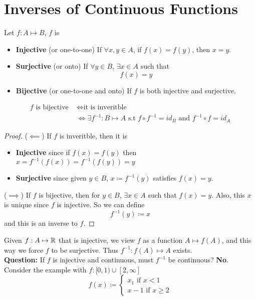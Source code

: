 \documentclass[openany]{report}
\begin{document}
    \section{Inverses of Continuous Functions}
        Let $f: A \mapsto B$, $f$ is  
        \begin{itemize}
            \item \textbf{Injective} (or one-to-one) If $\forall x,y \in A$, if $f(x) = f(y)$, then $x = y$.
            \item \textbf{Surjective} (or onto) If $\forall y \in B$, $\exists x \in A$ such that 
            \[f(x) = y\]
            \item \textbf{Bijective} (or one-to-one and onto) If $f$ is both injective and surjective.
        \end{itemize}
        \begin{align*}
            \text{$f$ is bijective } &\iff \text{it is inveritble }\\
            &\iff \exists f^{-1}:B \mapsto A \text{ s.t } f \circ f^{-1} = id_B \text{ and } f^{-1} \circ f = id_A
        \end{align*}
    \begin{proof}
        ($\impliedby$) If $f$ is inveritble, then it is 
        \begin{itemize}
            \item \textbf{Injective} since if $f(x) = f(y)$ then $x = f^{-1}(f(x)) = f^{-1}(f(y)) = y$
            \item \textbf{Surjective} since given $y \in B$, $x \coloneqq f^{-1}(y)$ satisfies $f(x) = y$. 
        \end{itemize}
        ($\implies$) If $f$ is bijective, then for $y \in B$, $\exists x \in A$ such that $f(x) = y$. Also, this $x$ is unique since $f$ is injective. So we can define 
        \[f^{-1}(y) \coloneqq x\]
        and this is an inverse to $f$.
    \end{proof}
    Given $f: A \mapsto \mathbb{R}$ that is injective, we view $f$ as a function $A \mapsto f(A)$, and this way we force $f$ to be surjective. Thus $f^{-1}: f(A) \mapsto A$ exists.\\[2ex]
    \textbf{Question:} If $f$ is injective and continuous, must $f^{-1}$ be continuous? \textbf{No}. Consider the example with $f: [0,1) \cup [2, \infty]$
    \[f(x) \coloneqq \begin{cases}
        x_1 \text{ if } x < 1 \\
        x - 1 \text{ if } x \geq 2
    \end{cases}\]
\end{document}
